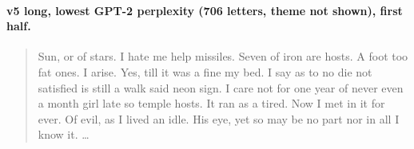\documentclass[11pt]{article}
\begin{document}
\paragraph{v5 long, lowest GPT-2 perplexity (706 letters, theme not shown), first half.}
\small
\begin{quote}
Sun, or of stars. I hate me help missiles. Seven of iron are hosts. A foot too fat ones. I arise. Yes, till it was a fine my bed. I say as to no die not satisfied is still a walk said neon sign. I care not for one year of never even a month girl late so temple hosts. It ran as a tired. Now I met in it for ever. Of evil, as I lived an idle. His eye, yet so may be no part nor in all I know it. \dots
\end{quote}
\normalsize
\end{document}
